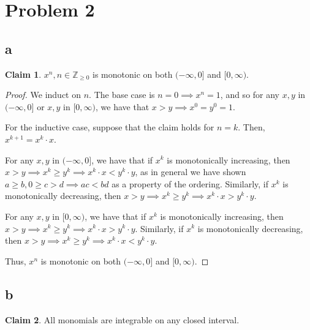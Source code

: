 \documentclass[12pt,letterpaper]{article}
\theoremstyle{definition}
\newtheorem*{claim}{Claim}
\newcommand{\Ze}{\mathbb{Z}_{\geq 0}}
\begin{document}
\section*{Problem 2}

\subsection*{a}

\begin{claim}
  $x^n, n \in \Ze$ is monotonic on both $(-\infty, 0]$ and $[0,\infty)$.
\end{claim}

\begin{proof}
  We induct on $n$. The base case is $n = 0 \implies x^n = 1$, and so for any
  $x,y$ in $(-\infty,0]$ or $x,y$ in $[0,\infty)$, we have that $x > y \implies x^0 = y^0 = 1$.

  For the inductive case, suppose that the claim holds for $n = k$. Then,
  $x^{k+1} = x^k \cdot x$.

  For any $x,y$ in $(-\infty, 0]$, we have that if
  $x^k$ is monotonically increasing, then $x > y \implies x^k \geq y^k \implies
  x^k\cdot x < y^k \cdot y$, as in general we have shown $a \geq b, 0 \geq c > d
  \implies ac < bd$ as a property of the ordering. Similarly, if $x^k$ is monotonically decreasing, then $x >
  y \implies x^k \geq y^k \implies x^k \cdot x > y^k \cdot y$.

  
  For any $x,y$ in $[0,\infty)$, we have that if
  $x^k$ is monotonically increasing, then $x > y \implies x^k \geq y^k \implies
  x^k\cdot x > y^k \cdot y$. Similarly, if $x^k$ is monotonically decreasing, then $x >
  y \implies x^k \geq y^k \implies x^k \cdot x < y^k \cdot y$.

  Thus, $x^n$ is monotonic on both $(-\infty,0]$ and $[0,\infty)$.
\end{proof}

\subsection*{b}

\begin{claim}
  All monomials are integrable on any closed interval.
\end{claim}
\end{document}
